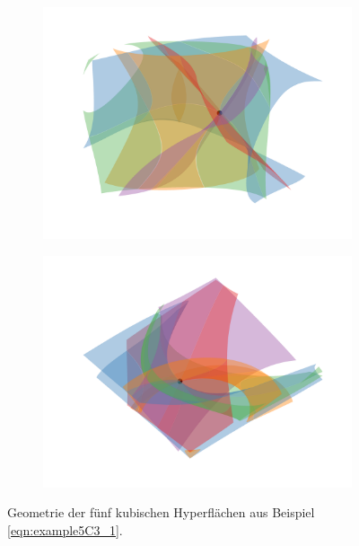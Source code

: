 \documentclass[a4paper,oneside, 11pt, openany%
]{article}
\theoremstyle{custom}
\theoremstyle{custom}
\begin{document}
\begin{figure}[H]
	\label{img:example10}
	\centering
	\begin{subfigure}[b]{0.8\textwidth}
		\includegraphics[width=\textwidth]{"images/e5c3_example1.png"}
	\end{subfigure}
\end{figure}
\begin{figure}[H]\ContinuedFloat
	\begin{subfigure}[b]{0.8\textwidth}
		\includegraphics[width=\textwidth]{"images/e5c3_example1_angle.png"}
	\end{subfigure}
	\caption{Geometrie der fünf kubischen Hyperflächen aus Beispiel  \eqref{eqn:example5C3_1}.}
\end{figure}
\end{document}
